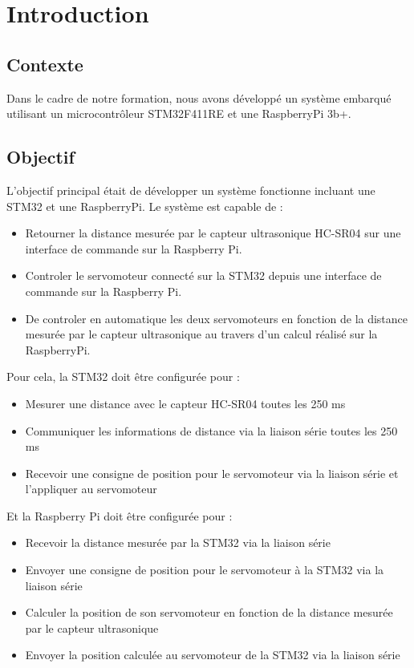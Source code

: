 \section{Introduction}
\subsection{Contexte}
Dans le cadre de notre formation, nous avons développé un système embarqué utilisant un microcontrôleur STM32F411RE et une RaspberryPi 3b+.

\subsection{Objectif}
L'objectif principal était de développer un système fonctionne incluant une STM32 et une RaspberryPi.
Le système est capable de :
\begin{itemize}
    \item Retourner la distance mesurée par le capteur ultrasonique HC-SR04 sur une interface de commande sur la Raspberry Pi.
    \item Controler le servomoteur connecté sur la STM32 depuis une interface de commande sur la Raspberry Pi.
    \item De controler en automatique les deux servomoteurs en fonction de la distance mesurée par le capteur ultrasonique au travers d'un calcul réalisé sur la RaspberryPi.
\end{itemize}

Pour cela, la STM32 doit être configurée pour :
\begin{itemize}
    \item Mesurer une distance avec le capteur HC-SR04 toutes les 250 ms
    \item Communiquer les informations de distance via la liaison série toutes les 250 ms
    \item Recevoir une consigne de position pour le servomoteur via la liaison série et l'appliquer au servomoteur
\end{itemize}

Et la Raspberry Pi doit être configurée pour :
\begin{itemize}
    \item Recevoir la distance mesurée par la STM32 via la liaison série
    \item Envoyer une consigne de position pour le servomoteur à la STM32 via la liaison série
    \item Calculer la position de son servomoteur en fonction de la distance mesurée par le capteur ultrasonique
    \item Envoyer la position calculée au servomoteur de la STM32 via la liaison série
\end{itemize}

